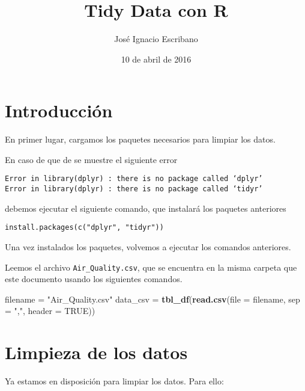 \documentclass[12pt,spanish,]{article}
\title{Tidy Data con R}
\author{José Ignacio Escribano}
\date{10 de abril de 2016}
\newenvironment{Shaded}{\begin{snugshade}}{\end{snugshade}}
\newcommand{\KeywordTok}[1]{\textcolor[rgb]{0.13,0.29,0.53}{\textbf{{#1}}}}
\newcommand{\DataTypeTok}[1]{\textcolor[rgb]{0.13,0.29,0.53}{{#1}}}
\newcommand{\StringTok}[1]{\textcolor[rgb]{0.31,0.60,0.02}{{#1}}}
\newcommand{\OtherTok}[1]{\textcolor[rgb]{0.56,0.35,0.01}{{#1}}}
\newcommand{\NormalTok}[1]{{#1}}
\begin{document}
\maketitle


{
\hypersetup{linkcolor=black}
\setcounter{tocdepth}{2}
\tableofcontents
}
\section{Introducción}\label{introduccion}

En primer lugar, cargamos los paquetes necesarios para limpiar los
datos.

En caso de que de se muestre el siguiente error

\begin{verbatim}
Error in library(dplyr) : there is no package called ‘dplyr’
Error in library(dplyr) : there is no package called ‘tidyr’
\end{verbatim}

debemos ejecutar el siguiente comando, que instalará los paquetes
anteriores

\begin{verbatim}
install.packages(c("dplyr", "tidyr"))
\end{verbatim}

Una vez instalados los paquetes, volvemos a ejecutar los comandos
anteriores.

Leemos el archivo \texttt{Air\_Quality.csv}, que se encuentra en la
misma carpeta que este documento usando los siguientes comandos.

\begin{Shaded}
\begin{Highlighting}[]
\NormalTok{filename =}\StringTok{ "Air_Quality.csv"}
\NormalTok{data_csv =}\StringTok{ }\KeywordTok{tbl_df}\NormalTok{(}\KeywordTok{read.csv}\NormalTok{(}\DataTypeTok{file =} \NormalTok{filename, }\DataTypeTok{sep =} \StringTok{","}\NormalTok{, }\DataTypeTok{header =} \OtherTok{TRUE}\NormalTok{))}
\end{Highlighting}
\end{Shaded}

\section{Limpieza de los datos}\label{limpieza-de-los-datos}

Ya estamos en disposición para limpiar los datos. Para ello:
\end{document}
